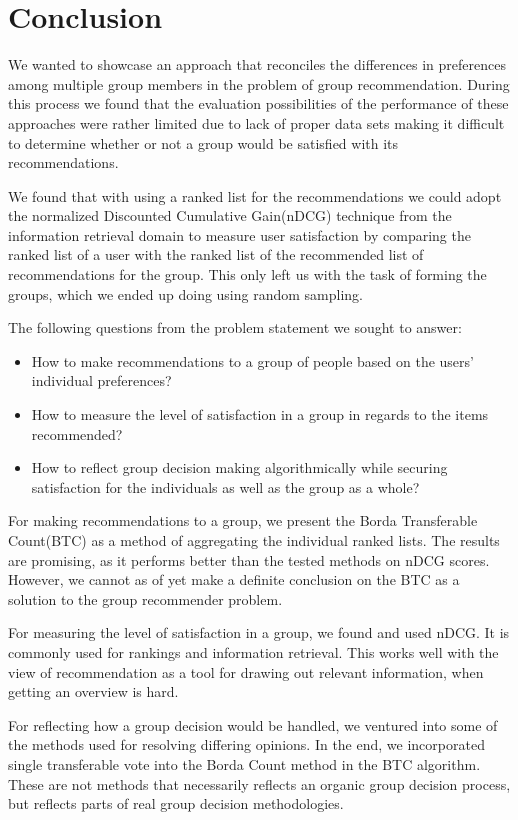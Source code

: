 \chapter{Conclusion} \label{ch:conclusion}
We wanted to showcase an approach that reconciles the differences in preferences among multiple group members in the problem of group recommendation. During this process we found that the evaluation possibilities of the performance of these approaches were rather limited due to lack of proper data sets making it difficult to determine whether or not a group would be satisfied with its recommendations.


We found that with using a ranked list for the recommendations we could adopt the normalized Discounted Cumulative Gain(nDCG) technique from the information retrieval domain to measure user satisfaction by comparing the ranked list of a user with the ranked list of the recommended list of recommendations for the group. This only left us with the task of forming the groups, which we ended up doing using random sampling.


The following questions from the problem statement we sought to answer:
\begin{itemize}
	\item How to make recommendations to a group of people based on the users' individual preferences?
	\item How to measure the level of satisfaction in a group in regards to the items recommended?
	\item How to reflect group decision making algorithmically while securing satisfaction for the individuals as well as the group as a whole?
\end{itemize}


For making recommendations to a group, we present the Borda Transferable Count(BTC) as a method of aggregating the individual ranked lists. The results are promising, as it performs better than the tested methods on nDCG scores. However, we cannot as of yet make a definite conclusion on the BTC as a solution to the group recommender problem.


For measuring the level of satisfaction in a group, we found and used nDCG. It is commonly used for rankings and information retrieval. This works well with the view of recommendation as a tool for drawing out relevant information, when getting an overview is hard.


For reflecting how a group decision would be handled, we ventured into some of the methods used for resolving differing opinions. In the end, we incorporated single transferable vote into the Borda Count method in the BTC algorithm. These are not methods that necessarily reflects an organic group decision process, but reflects parts of real group decision methodologies.


